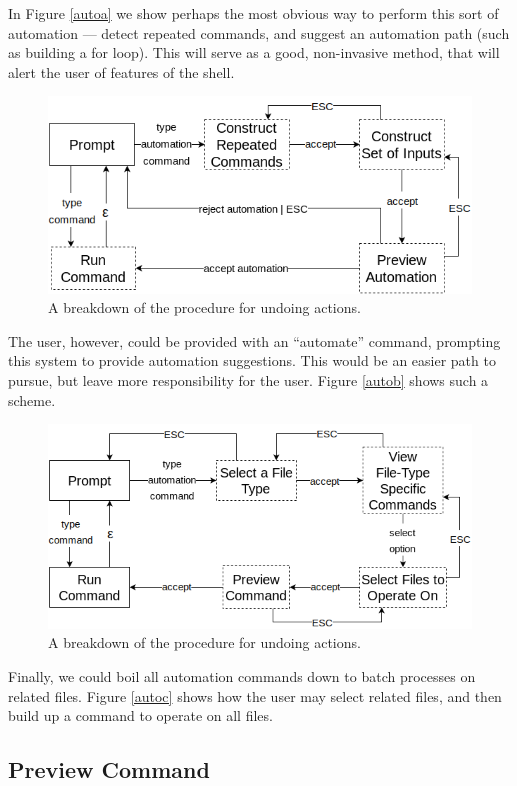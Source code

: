 In Figure \ref{autoa} we show perhaps the most obvious way to perform this sort
of automation --- detect repeated commands, and suggest an automation path (such
as building a for loop). This will serve as a good, non-invasive method, that
will alert the user of features of the shell.

\begin{figure}[H]
  \centering
  \includegraphics[width=0.8\linewidth]{figures/alternatives/automate_b.png}
  \caption{A breakdown of the procedure for undoing actions.}
  \label{fig:autob}
\end{figure}

The user, however, could be provided with an ``automate'' command, prompting
this system to provide automation suggestions. This would be an easier path to
pursue, but leave more responsibility for the user. Figure \ref{autob} shows
such a scheme.

\begin{figure}[H]
  \centering
  \includegraphics[width=0.8\linewidth]{figures/alternatives/automate_c.png}
  \caption{A breakdown of the procedure for undoing actions.}
  \label{fig:autoc}
\end{figure}

Finally, we could boil all automation commands down to batch processes on
related files. Figure \ref{autoc} shows how the user may select related files,
and then build up a command to operate on all files.

\subsection{Preview Command}

